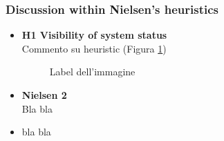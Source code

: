 \subsubsection{Discussion within Nielsen's heuristics}
\begin{itemize}
    \item \textbf{H1 Visibility of system status}\\
    Commento su heuristic (Figura \ref{fig:1-image-ref})
    \begin{figure}[!ht]
        \begin{minipage}{\linewidth}
            \centering
            \captionsetup{justification=centering}
            \caption{Label dell'immagine}
            \label{fig:1-image-ref}
        \end{minipage}
    \end{figure}
    \item \textbf{Nielsen 2}\\
    Bla bla
    \item bla bla
\end{itemize}

